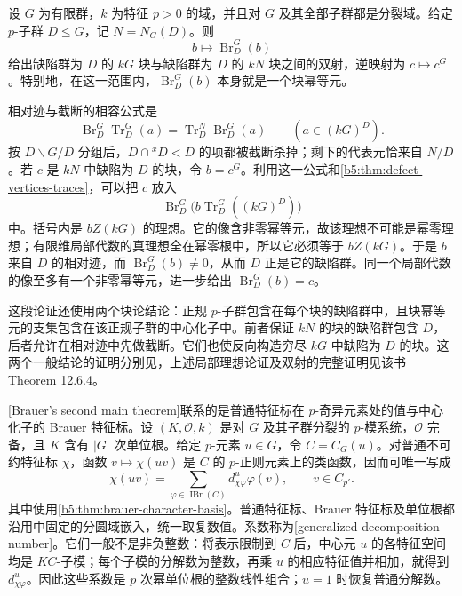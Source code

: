 \begin{theorem}\label{b5:thm:brauer-first-main}
	设 \(G\) 为有限群，\(k\) 为特征 \(p>0\) 的域，并且对 \(G\) 及其全部子群都是分裂域。给定 \(p\)-子群 \(D\le G\)，记 \(N=N_G(D)\)。则
	\[
		b\longmapsto\operatorname{Br}_D^G(b)
	\]
	给出缺陷群为 \(D\) 的 \(kG\) 块与缺陷群为 \(D\) 的 \(kN\) 块之间的双射，逆映射为 \(c\mapsto c^G\)。特别地，在这一范围内，\(\operatorname{Br}_D^G(b)\) 本身就是一个块幂等元。
\end{theorem}
\begin{proofsketch}
	相对迹与截断的相容公式是
	\[
		\operatorname{Br}_D^G\operatorname{Tr}_D^G(a)
		=\operatorname{Tr}_D^N\operatorname{Br}_D^G(a)
		\qquad(a\in(kG)^D).
	\]
	按 \(D\backslash G/D\) 分组后，\(D\cap{}^xD<D\) 的项都被截断杀掉；剩下的代表元恰来自 \(N/D\)。若 \(c\) 是 \(kN\) 中缺陷为 \(D\) 的块，令 \(b=c^G\)。利用这一公式和\cref{b5:thm:defect-vertices-traces}，可以把 \(c\) 放入
	\[
		\operatorname{Br}_D^G\bigl(b\operatorname{Tr}_D^G((kG)^D)\bigr)
	\]
	中。括号内是 \(bZ(kG)\) 的理想。它的像含非零幂等元，故该理想不可能是幂零理想；有限维局部代数的真理想全在幂零根中，所以它必须等于 \(bZ(kG)\)。于是 \(b\) 来自 \(D\) 的相对迹，而 \(\operatorname{Br}_D^G(b)\ne0\)，从而 \(D\) 正是它的缺陷群。同一个局部代数的像至多有一个非零幂等元，进一步给出 \(\operatorname{Br}_D^G(b)=c\)。

	这段论证还使用两个块论结论：正规 \(p\)-子群包含在每个块的缺陷群中，且块幂等元的支集包含在该正规子群的中心化子中。前者保证 \(kN\) 的块的缺陷群包含 \(D\)，后者允许在相对迹中先做截断。它们也使反向构造穷尽 \(kG\) 中缺陷为 \(D\) 的块。这两个一般结论的证明分别见\cite[Corollary 12.3.4 and Proposition 12.5.7]{Webb2016FiniteGroupRepresentations}，上述局部理想论证及双射的完整证明见该书 Theorem 12.6.4。
\end{proofsketch}

[Brauer's second main theorem]联系的是普通特征标在 \(p\)-奇异元素处的值与中心化子的 Brauer 特征标。设 \((K,\mathcal O,k)\) 是对 \(G\) 及其子群分裂的 \(p\)-模系统，\(\mathcal O\) 完备，且 \(K\) 含有 \(|G|\) 次单位根。给定 \(p\)-元素 \(u\in G\)，令 \(C=C_G(u)\)。对普通不可约特征标 \(\chi\)，函数 \(v\mapsto\chi(uv)\) 是 \(C\) 的 \(p\)-正则元素上的类函数，因而可唯一写成
\begin{equation}\label{b5:eq:generalized-decomposition-numbers}
	\chi(uv)=\sum_{\varphi\in\operatorname{IBr}(C)}d^u_{\chi\varphi}\varphi(v),
	\qquad v\in C_{p'}.
\end{equation}
其中使用\cref{b5:thm:brauer-character-basis}。普通特征标、Brauer 特征标及单位根都沿用中固定的分圆域嵌入，统一取复数值。系数称为[generalized decomposition number]。它们一般不是非负整数：将表示限制到 \(C\) 后，中心元 \(u\) 的各特征空间均是 \(KC\)-子模；每个子模的分解数为整数，再乘 \(u\) 的相应特征值并相加，就得到 \(d^u_{\chi\varphi}\)。因此这些系数是 \(p\) 次幂单位根的整数线性组合；\(u=1\) 时恢复普通分解数。

